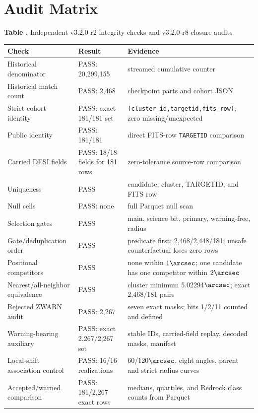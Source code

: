 \documentclass[twocolumn]{aastex701}
\newcommand{\paperVersion}{v3.2.0-r8}
\newcommand{\releaseVersion}{v3.2.0-r2}
\begin{document}
\section{Audit Matrix}\label{app:audit}

\label{tab:audit}
\begin{center}
\textbf{Table \thetable.} Independent \releaseVersion{} integrity checks and \paperVersion{} closure audits

\smallskip
\scriptsize
\begin{tabular}{p{}p{}p{}}
\toprule
Check & Result & Evidence \\
\midrule
Historical denominator & PASS: 20,299,155 & streamed cumulative counter \\
Historical match count & PASS: 2,468 & checkpoint parts and cohort JSON \\
Strict cohort identity & PASS: exact 181/181 set & \texttt{(cluster\_id,targetid,fits\_row)}; zero missing/unexpected \\
Public identity & PASS: 181/181 & direct FITS-row \texttt{TARGETID} comparison \\
Carried DESI fields & PASS: 18/18 fields for 181 rows & zero-tolerance source-row comparison \\
Uniqueness & PASS & candidate, cluster, TARGETID, and FITS row \\
Null cells & PASS: none & full Parquet null scan \\
Selection gates & PASS & main, science bit, primary, warning-free, radius \\
Gate/deduplication order & PASS & predicate first; 2,468/2,448/181; unsafe counterfactual loses zero rows \\
Positional competitors & PASS & none within $1\arcsec$; one candidate has one competitor within $2\arcsec$ \\
Nearest/all-neighbor equivalence & PASS & cluster minimum 5.02294$\arcsec$; exact 2,468/181 pairs \\
Rejected ZWARN audit & PASS: 2,267 & seven exact masks; bits 1/2/11 counted and defined \\
Warning-bearing auxiliary & PASS: exact 2,267/2,267 set & stable IDs, carried-field replay, decoded masks, manifest \\
Local-shift association control & PASS: 16/16 realizations & 60/120$\arcsec$, eight angles, parent and strict radius curves \\
Accepted/warned comparison & PASS: 181/2,267 exact rows & medians, quartiles, and Redrock class counts from Parquet \\

\end{tabular}
\end{center}
\end{document}
